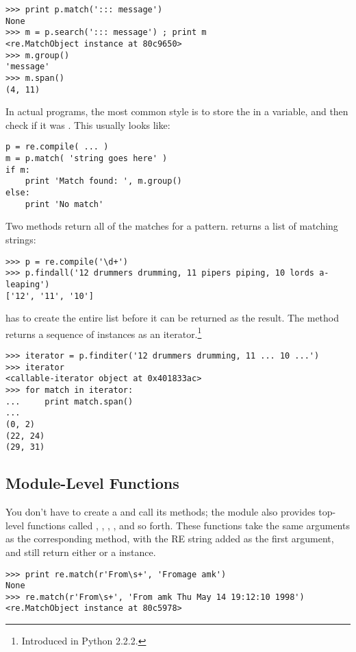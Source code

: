 \documentclass{howto}
\begin{document}
\begin{verbatim}
>>> print p.match('::: message')
None
>>> m = p.search('::: message') ; print m
<re.MatchObject instance at 80c9650>
>>> m.group()
'message'
>>> m.span()
(4, 11)
\end{verbatim}

In actual programs, the most common style is to store the
 in a variable, and then check if it was
.  This usually looks like:

\begin{verbatim}
p = re.compile( ... )
m = p.match( 'string goes here' )
if m:
    print 'Match found: ', m.group()
else:
    print 'No match'
\end{verbatim}

Two  methods return all of the matches for a pattern.
 returns a list of matching strings:

\begin{verbatim}
>>> p = re.compile('\d+')
>>> p.findall('12 drummers drumming, 11 pipers piping, 10 lords a-leaping')
['12', '11', '10']
\end{verbatim}

 has to create the entire list before it can be
returned as the result.  The  method returns a
sequence of  instances as an
iterator.\footnote{Introduced in Python 2.2.2.}

\begin{verbatim}
>>> iterator = p.finditer('12 drummers drumming, 11 ... 10 ...')
>>> iterator
<callable-iterator object at 0x401833ac>
>>> for match in iterator:
...     print match.span()
...
(0, 2)
(22, 24)
(29, 31)
\end{verbatim}


\subsection{Module-Level Functions}

You don't have to create a  and call its methods;
the  module also provides top-level functions called
, , ,
, and so forth.  These functions take the same
arguments as the corresponding  method, with the RE
string added as the first argument, and still return either
 or a  instance.

\begin{verbatim}
>>> print re.match(r'From\s+', 'Fromage amk')
None
>>> re.match(r'From\s+', 'From amk Thu May 14 19:12:10 1998')
<re.MatchObject instance at 80c5978>
\end{verbatim}
\end{document}
